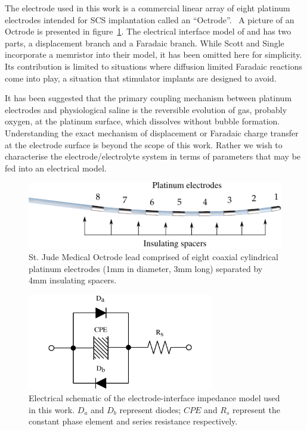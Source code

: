 \documentclass[journal, a4paper]{IEEEtran}
\begin{document}
The electrode used in this work is a commercial linear array of eight platinum electrodes intended for SCS implantation called an ``Octrode''.~\cite{StJudeOctrode} A picture of an Octrode is presented in figure~\ref{fig:octrode}.
The electrical interface model of \cite{Franks2005} and \cite{ScottSingle2013} has two parts, a displacement branch and a Faradaic branch. {\color{blue} While Scott and Single \cite{ScottSingle2013} incorporate a memristor into their model, it has been omitted here for simplicity. Its contribution is limited to situations where diffusion limited Faradaic reactions come into play, a situation that stimulator implants are designed to avoid.}

{
    \color{blue}
It has been suggested that the primary coupling mechanism between platinum electrodes and physiological saline is the reversible evolution of gas, probably oxygen, at the platinum surface, which dissolves without bubble formation.\cite{Greatbatch1969} Understanding the exact mechanism of displacement or Faradaic charge transfer at the electrode surface is beyond the scope of this work. Rather we wish to characterise the electrode/electrolyte system in terms of parameters that may be fed into an electrical model. 
}

\begin{figure}
    \begin{center}
    \includegraphics{graphics/StJudeOctrodeDiagram}
    \end{center}
    \caption{St. Jude Medical Octrode lead comprised of eight coaxial cylindrical platinum electrodes (1mm in diameter, 3mm long) separated by 4mm insulating spacers.}
    \label{fig:octrode}
\end{figure}

\begin{figure}
    \begin{center}
        \includegraphics[width=230pt]{graphics/interfaceSchematic_noMemristive}
    \end{center}
    \caption{Electrical schematic of the electrode-interface impedance model used in this work. $D_{a}$ and $D_{b}$ represent diodes; $CPE$ and $R_{s}$ represent the constant phase element and series resistance respectively.}
    \label{fig:schematic}
\end{figure}
\end{document}
